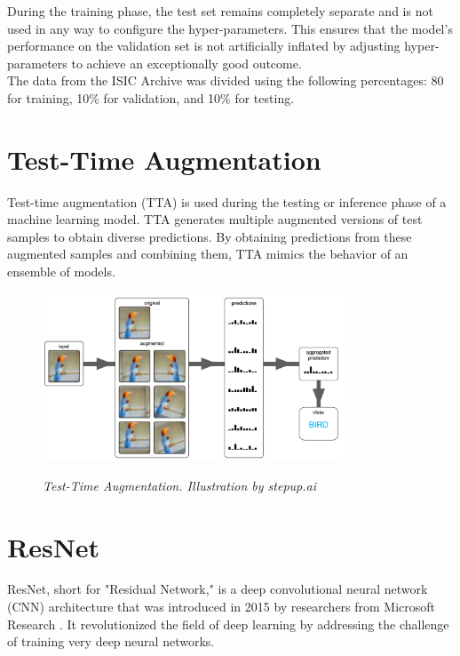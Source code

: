 During the training phase, the test set remains completely separate and is not
used in any way to configure the hyper-parameters. This ensures that the
model's performance on the validation set is not artificially inflated by
adjusting hyper-parameters to achieve an exceptionally good outcome. \\

The data from the ISIC Archive was divided using the following percentages: 80%
for training, 10\% for validation, and 10\% for testing.

\section{Test-Time Augmentation}

Test-time augmentation (TTA) is used during the testing or inference phase of a
machine learning model. TTA generates multiple augmented versions of test
samples to obtain diverse predictions. By obtaining predictions from these
augmented samples and combining them, TTA mimics the behavior of an ensemble of
models.

\begin{figure}[H]
  \centering
  \includegraphics[width=0.8\textwidth]{imatges/preliminaries/tta.png}
  \caption[Test-Time Augmentation]{\textit{Test-Time Augmentation. Illustration by stepup.ai}}
  {\label{fig:tta}}
\end{figure}

\newpage

\section{ResNet}

ResNet, short for "Residual Network," is a deep convolutional neural network
(CNN) architecture that was introduced in 2015 by researchers from Microsoft
Research \cite{ResNetPaper}. It revolutionized the field of deep learning by
addressing the challenge of training very deep neural networks. \\

